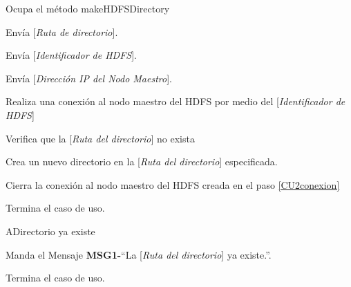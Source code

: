 
\begin{UCtrayectoria}

\UCpaso[\UCactor] Ocupa el método makeHDFSDirectory

\UCpaso[\UCactor] Envía [{\em Ruta de directorio}].

\UCpaso[\UCactor] Envía [{\em Identificador de HDFS}].

\UCpaso[\UCactor] Envía [{\em Dirección IP del Nodo Maestro}].

\UCpaso[\UCsist] Realiza una conexión al nodo maestro del HDFS por medio del [{\em Identificador de HDFS}]\label{CU2conexion}

\UCpaso[\UCsist] Verifica que la [{\em Ruta del directorio}] no exista 

\UCpaso[\UCsist] Crea un nuevo directorio en la [{\em Ruta del directorio}] especificada.

\UCpaso[\UCsist] Cierra la conexión al nodo maestro del HDFS creada en el paso \ref{CU2conexion}

\UCpaso[] Termina el caso de uso.

\end{UCtrayectoria}




\begin{UCtrayectoriaA}{A}{Directorio ya existe}

	\UCpaso Manda el Mensaje {\bf MSG1-}``La [{\em Ruta del directorio}] ya existe.''.

	\UCpaso[] Termina el caso de uso.

\end{UCtrayectoriaA}




